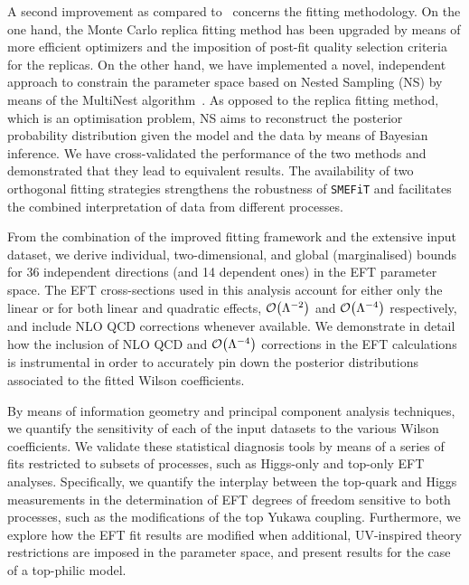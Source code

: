 A second improvement as compared to~\cite{Hartland:2019bjb}
concerns the fitting methodology.
%
On the one hand, the  Monte Carlo replica fitting method has been
upgraded by means of more efficient optimizers and the imposition of
post-fit quality selection criteria for the replicas.
%
On the other hand, we have implemented a novel, independent
approach to constrain the  parameter space based on
Nested Sampling (NS) by means of the MultiNest algorithm~\cite{Feroz:2013hea}.
%
As opposed to the replica fitting method, which is an
optimisation problem,
NS aims to reconstruct the posterior probability distribution given
the model and the data by means of Bayesian inference.
%
We have cross-validated the performance
of  the two methods and demonstrated that they
lead to equivalent results.
%
The availability of two orthogonal fitting strategies
strengthens the robustness of {\tt SMEFiT} and facilitates the
combined interpretation of data from different processes.

From the combination of the  improved fitting framework
and the extensive input dataset, we 
derive individual, two-dimensional, and global (marginalised) bounds for  36
independent directions (and 14 dependent ones) in the EFT parameter space.
%
The EFT cross-sections used in this analysis account for
either only the linear
or for both linear and quadratic effects, $\mathcal{O}\lp \Lambda^{-2}\rp$ and
$\mathcal{O}\lp \Lambda^{-4}\rp$ respectively, and
include NLO QCD corrections whenever available.
%
We demonstrate in detail how the inclusion of NLO QCD
and $\mathcal{O}\lp \Lambda^{-4}\rp$ corrections
in the EFT calculations
is instrumental in order to accurately pin down the  posterior distributions associated
to the fitted Wilson coefficients.

By means of information geometry and principal component analysis techniques,
we quantify the sensitivity of each
of the input datasets to the various Wilson coefficients.
%
We validate these statistical diagnosis tools by means of a series of  fits restricted
to subsets of processes, such as Higgs-only and top-only EFT analyses.
%
Specifically, we quantify the interplay between the top-quark and Higgs measurements
in the determination of EFT degrees of freedom sensitive to both processes,
such as the modifications of the top Yukawa coupling.
%
Furthermore, we explore how the EFT fit results are modified when additional, UV-inspired theory restrictions
are imposed in the parameter space, and present results
for the case of a top-philic model.

